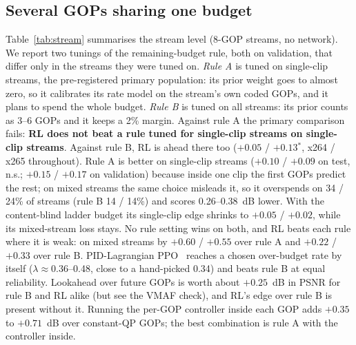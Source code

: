 \documentclass[conference]{IEEEtran}
\newcommand{\sig}{$^{*}$}
\begin{document}
\subsection{Several GOPs sharing one budget}
Table~\ref{tab:stream} summarises the stream level (8-GOP streams, no network). We report two tunings of the remaining-budget rule, both on validation, that differ only in the streams they were tuned on. \emph{Rule A} is tuned on single-clip streams, the pre-registered primary population: its prior weight goes to almost zero, so it calibrates its rate model on the stream's own coded GOPs, and it plans to spend the whole budget. \emph{Rule B} is tuned on all streams: its prior counts as 3--6 GOPs and it keeps a 2\% margin. Against rule A the primary comparison fails: \textbf{RL does not beat a rule tuned for single-clip streams on single-clip streams}. Against rule B, RL is ahead there too ($+0.05$ / $+0.13$\sig, x264 / x265 throughout). Rule A is better on single-clip streams ($+0.10$ / $+0.09$ on test, n.s.; $+0.15$ / $+0.17$ on validation) because inside one clip the first GOPs predict the rest; on mixed streams the same choice misleads it, so it overspends on 34 / 24\% of streams (rule B 14 / 14\%) and scores 0.26--0.38~dB lower. With the content-blind ladder budget its single-clip edge shrinks to $+0.05$ / $+0.02$, while its mixed-stream loss stays. No rule setting wins on both, and RL beats each rule where it is weak: on mixed streams by $+0.60$ / $+0.55$ over rule A and $+0.22$ / $+0.33$ over rule B. PID-Lagrangian PPO~\cite{stooke2020pid} reaches a chosen over-budget rate by itself ($\lambda\approx0.36$--0.48, close to a hand-picked 0.34) and beats rule B at equal reliability. Lookahead over future GOPs is worth about $+0.25$~dB in PSNR for rule B and RL alike (but see the VMAF check), and RL's edge over rule B is present without it. Running the per-GOP controller inside each GOP adds $+0.35$ to $+0.71$~dB over constant-QP GOPs; the best combination is rule A with the controller inside.
\end{document}
